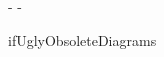 %
\def\horizhtdp{height\rule@height depth\rule@depth}%
\def\axisheight{\fontdimen22\the\textfont\tw@}%
\def\script@axisheight{\fontdimen22\the\scriptfont\tw@}%
\def\ss@axisheight{\fontdimen22\the\scriptscriptfont\tw@}%
\def\default@mapbreadth{0.4pt}%
\def\word@stretch{\fontdimen3\textfont\z@}%
\def\word@shrink{\fontdimen3\textfont\z@}%
%
%
\newdimen\PileSpacing
\newdimen\cd@left@margin        \cd@left@margin\z@
\def\min@map@length{\ifincommdiag 1.3em\else 2em\fi}%
\newdimen\cd@top@height
%
\def\CellSize{\afterassignment\cell@height@to@width\DiagramCellHeight}%
\newdimen\DiagramCellHeight     \DiagramCellHeight-\maxdimen
\newdimen\DiagramCellWidth      \DiagramCellWidth-\maxdimen
\def\cell@height@to@width{\DiagramCellWidth\DiagramCellHeight}%
%
\def\default@size{3em}%
%
\newdimen\MapShortFall
\def\MapsAbut{\MapShortFall\z@\objectheight\z@\objectwidth\z@}%
%
\newdimen\cd@hshift\cd@hshift\z@ %
%
%
%
%
\new@if\if@cd@use@PS@\@cd@use@PS@true\@cd@use@PS@false
\expandafter
   \ifx\expandafter\iftrue\csname ifUglyObsoleteDiagrams\endcsname
        \@cd@use@PS@false
   \else\@cd@use@PS@true
   \fi
{}%
\newif\ifUglyObsoleteDiagrams
\def\use@ps{\@cd@use@PS@true\UglyObsoleteDiagramsfalse}%
\def\dont@use@ps{\@cd@use@PS@false\UglyObsoleteDiagramstrue}%
\if@cd@use@PS@\use@ps\else\dont@use@ps\fi
%
%
\new@if\if@pdf@\@pdf@true\@pdf@false\@pdf@false
% 
%
\def\test@pdf{%
 \ifx\pdfoutput\undefined\else
 \ifx\pdfoutput\relax\else
 \ifnum\pdfoutput>\z@\use@pdf
 \fi\fi\fi
}

